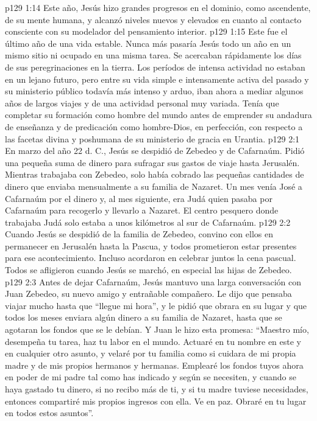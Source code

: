 \vs p129 1:14 \pc Este año, Jesús hizo grandes progresos en el dominio, como ascendente, de su mente humana, y alcanzó niveles nuevos y elevados en cuanto al contacto consciente con su modelador del pensamiento interior.
\vs p129 1:15 Este fue el último año de una vida estable. Nunca más pasaría Jesús todo un año en un mismo sitio ni ocupado en una misma tarea. Se acercaban rápidamente los días de sus peregrinaciones en la tierra. Los períodos de intensa actividad no estaban en un lejano futuro, pero entre su vida simple e intensamente activa del pasado y su ministerio público todavía más intenso y arduo, iban ahora a mediar algunos años de largos viajes y de una actividad personal muy variada. Tenía que completar su formación como hombre del mundo antes de emprender su andadura de enseñanza y de predicación como hombre\hyp{}Dios, en perfección, con respecto a las facetas divina y poshumana de su ministerio de gracia en Urantia.
\vs p129 2:1 En marzo del año 22 d. C., Jesús se despidió de Zebedeo y de Cafarnaúm. Pidió una pequeña suma de dinero para sufragar sus gastos de viaje hasta Jerusalén. Mientras trabajaba con Zebedeo, solo había cobrado las pequeñas cantidades de dinero que enviaba mensualmente a su familia de Nazaret. Un mes venía José a Cafarnaúm por el dinero y, al mes siguiente, era Judá quien pasaba por Cafarnaúm para recogerlo y llevarlo a Nazaret. El centro pesquero donde trabajaba Judá solo estaba a unos kilómetros al sur de Cafarnaúm.
\vs p129 2:2 Cuando Jesús se despidió de la familia de Zebedeo, convino con ellos en permanecer en Jerusalén hasta la Pascua, y todos prometieron estar presentes para ese acontecimiento. Incluso acordaron en celebrar juntos la cena pascual. Todos se afligieron cuando Jesús se marchó, en especial las hijas de Zebedeo.
\vs p129 2:3 \pc Antes de dejar Cafarnaúm, Jesús mantuvo una larga conversación con Juan Zebedeo, su nuevo amigo y entrañable compañero. Le dijo que pensaba viajar mucho hasta que “llegue mi hora”, y le pidió que obrara en su lugar y que todos los meses enviara algún dinero a su familia de Nazaret, hasta que se agotaran los fondos que se le debían. Y Juan le hizo esta promesa: “Maestro mío, desempeña tu tarea, haz tu labor en el mundo. Actuaré en tu nombre en este y en cualquier otro asunto, y velaré por tu familia como si cuidara de mi propia madre y de mis propios hermanos y hermanas. Emplearé los fondos tuyos ahora en poder de mi padre tal como has indicado y según se necesiten, y cuando se haya gastado tu dinero, si no recibo más de ti, y si tu madre tuviese necesidades, entonces compartiré mis propios ingresos con ella. Ve en paz. Obraré en tu lugar en todos estos asuntos”.

